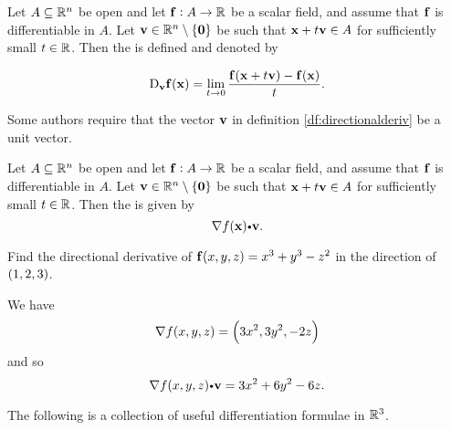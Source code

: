 \begin{df}
Let $A \subseteq \mathbb{R}^n$ be open and  let $\mathbf{ f}:A \rightarrow \mathbb{R}$
be a scalar field, and assume that $\mathbf{ f}$ is differentiable in $A$. Let
$\mathbf{ v}\in \mathbb{R}^n \setminus \{{\mathbf 0}\}$ be such that
${\mathbf x} + t\mathbf{ v} \in A$ for sufficiently small $t\in
\mathbb{R}$. Then the  is defined and
denoted by

$$\mathrm{D}_{\mathbf{ v}}\mathbf{ f}({\mathbf x}) = \lim _{t\rightarrow 0} \dfrac{\mathbf{ f}({\mathbf x} + t\mathbf{ v}) - \mathbf{ f}({\mathbf x})}{t}. $$

\label{df:directionalderiv}\end{df}
\begin{rem}
Some authors require that the vector $\mathbf{ v}$ in definition
\ref{df:directionalderiv} be a unit vector.
\end{rem}
\begin{thm}
Let $A \subseteq \mathbb{R}^n$ be open and  let $\mathbf{ f}:A \rightarrow \mathbb{R}$
be a scalar field, and assume that $\mathbf{ f}$ is differentiable in $A$. Let
$\mathbf{ v}\in \mathbb{R}^n \setminus \{\mathbf{ 0}\}$ be such that
$\mathbf{ x} + t\mathbf{ v} \in A$ for sufficiently small $t\in
\mathbb{R}$. Then the  is given by
$$\nabla f(\point{x}) \bp \vector{v}.$$
\end{thm}
\begin{exa}
Find the directional derivative of $\mathbf{ f}(x, y, z) = x^3 + y^3 - z^2$ in
the direction of $\left( 1 ,2 ,3 \right)$.
\end{exa}
\begin{solu} We have
$$\nabla f(x,y,z) = \left( 3x^2 ,3y^2 ,-2z \right)$$and so
$$ \nabla f(x,y,z)\bp \vector{v} = 3x^2 + 6y^2 - 6z. $$
\end{solu}


The following is a collection of useful differentiation formulae in $\mathbb{R}^3$.

